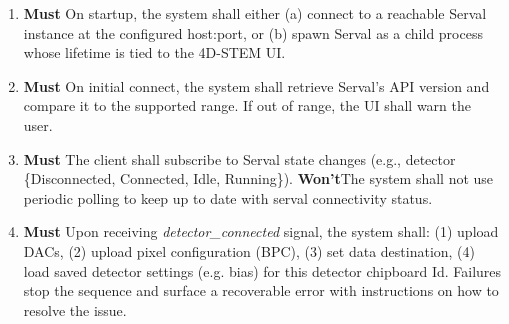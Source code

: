 \documentclass[10pt]{article}
\newcommand{\PriorityTag}[2]{%
    \colorbox{#2!25}{\footnotesize\textsf{\textbf{#1}}}\hspace{0.6em}}
\newcommand{\must}{\leavevmode\PriorityTag{Must}{green}}
\newcommand{\could}{\leavevmode\PriorityTag{Could}{cyan}}
\newcommand{\wont}{\leavevmode\PriorityTag{Won't}{red}}
\newcounter{reqgrp}[section] %
\newcounter{reqno}
\newcommand{\reqprefix}{GEN}
\newenvironment{requirements}[1]{%
    \renewcommand{\reqprefix}{#1}%
    \refstepcounter{reqgrp}%
    \setcounter{reqno}{0}%
    \begin{enumerate}[leftmargin=*]
    }{\end{enumerate}}
\begin{document}
    \begin{requirements}{SRV}

        \item \must {}
        {On startup, the system shall either (a) connect to a reachable Serval instance at the configured host:port, or (b) spawn Serval as a child process whose lifetime is tied to the 4D-STEM UI.}

        \item \must {}
        {On initial connect, the system shall retrieve Serval's API version and compare it to the supported range. If out of range, the UI shall warn the user.}

        \item \must {}
        {The client shall subscribe to Serval state changes (e.g., detector \{Disconnected, Connected, Idle, Running\}). \wont The system shall not use periodic polling to keep up to date with serval connectivity status.}

        \item \must {}
        {Upon receiving \emph{detector\_connected} signal, the system shall: (1) upload DACs, (2) upload pixel configuration (BPC), (3) set data destination, (4) load saved detector settings (e.g. bias) for this detector chipboard Id. Failures stop the sequence and surface a recoverable error with instructions on how to resolve the issue.}


\end{requirements}
\end{document}
